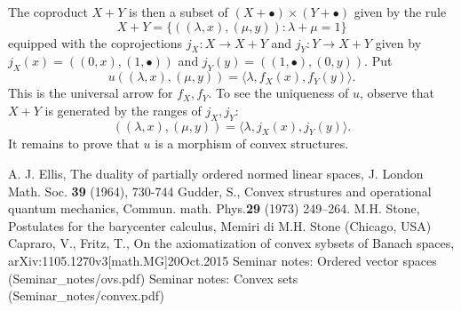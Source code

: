 \documentclass[12pt,letterpaper]{article}
\newcommand{\<}{\langle}
\def\>{\rangle}
\begin{document}
The coproduct $X+Y$ is then a subset of $(X+\bullet)\times(Y+\bullet)$ given by the rule
$$
X+Y=\{((\lambda,x),(\mu,y))\colon \lambda+\mu=1\}
$$
equipped with the coprojections $j_X:X\to X+Y$ and $j_Y:Y\to X+Y$ 
given by $j_X(x)=((0,x),(1,\bullet))$ and $j_Y(y)=((1,\bullet),(0,y))$.
Put
$$
u((\lambda,x),(\mu,y))=\<\lambda,f_X(x),f_Y(y)\>.
$$
This is the universal arrow for $f_X,f_Y$.
To see the uniqueness of $u$, observe that $X+Y$ is generated by the ranges of $j_X,j_Y$:
$$
((\lambda,x),(\mu,y))=\<\lambda,j_X(x),j_Y(y)\>.
$$
It remains to prove that $u$ is a morphism of convex structures.

\begin{thebibliography}{WWW}
 A. J. Ellis, The duality of partially ordered normed linear spaces, J. London Math. Soc. \textbf{39} (1964), 730-744
 Gudder, S., Convex strustures and operational quantum mechanics, Commun. math. Phys.{\bf 29} (1973) 249--264.
 M.H. Stone, Postulates for the barycenter calculus, Memiri di M.H. Stone (Chicago, USA)
 Capraro, V., Fritz, T., On the axiomatization of convex sybsets of Banach spaces, arXiv:1105.1270v3[math.MG]20Oct.2015
 Seminar notes: Ordered vector spaces (Seminar\_notes/ovs.pdf)
 Seminar notes: Convex sets (Seminar\_notes/convex.pdf)

\end{thebibliography}
\end{document}
